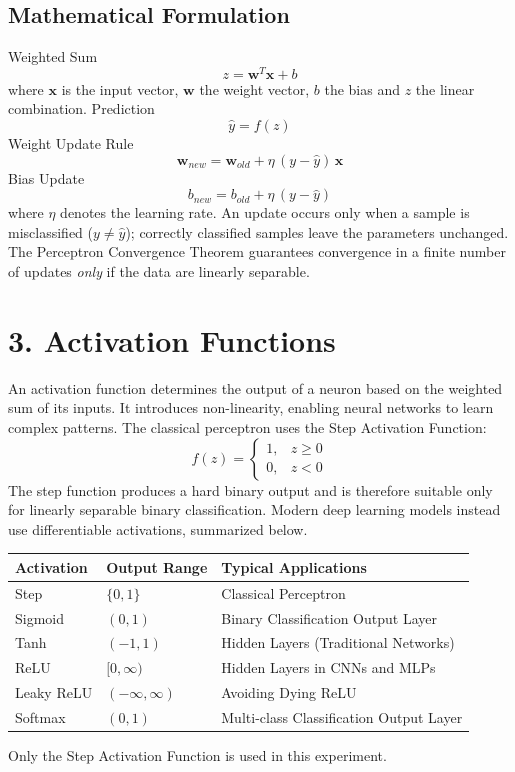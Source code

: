 \documentclass[11pt]{article}
\begin{document}
\subsection*{Mathematical Formulation}
Weighted Sum
\[
z=\mathbf{w}^{T}\mathbf{x}+b
\]
where $\mathbf{x}$ is the input vector, $\mathbf{w}$ the weight vector, $b$ the bias and $z$ the linear combination.
Prediction
\[
\hat y=f(z)
\]
Weight Update Rule
\[
\mathbf{w}_{new}=\mathbf{w}_{old}+\eta\,(y-\hat y)\,\mathbf{x}
\]
Bias Update
\[
b_{new}=b_{old}+\eta\,(y-\hat y)
\]
where $\eta$ denotes the learning rate. An update occurs only when a sample is misclassified ($y\neq\hat y$); correctly classified samples leave the parameters unchanged. The Perceptron Convergence Theorem guarantees convergence in a finite number of updates \emph{only} if the data are linearly separable.
\section*{3. Activation Functions}
An activation function determines the output of a neuron based on the weighted sum of its inputs. It introduces non-linearity, enabling neural networks to learn complex patterns. The classical perceptron uses the Step Activation Function:
\[
f(z)=
\begin{cases}
1,&z\ge0\\
0,&z<0
\end{cases}
\]
The step function produces a hard binary output and is therefore suitable only for linearly separable binary classification. Modern deep learning models instead use differentiable activations, summarized below.
\begin{center}
\begin{tabular}{|p{2.5cm}|p{3cm}|p{6cm}|}
\hline
\textbf{Activation} & \textbf{Output Range} & \textbf{Typical Applications}\\
\hline
Step & $\{0,1\}$ & Classical Perceptron\\
\hline
Sigmoid & $(0,1)$ & Binary Classification Output Layer\\
\hline
Tanh & $(-1,1)$ & Hidden Layers (Traditional Networks)\\
\hline
ReLU & $[0,\infty)$ & Hidden Layers in CNNs and MLPs\\
\hline
Leaky ReLU & $(-\infty,\infty)$ & Avoiding Dying ReLU\\
\hline
Softmax & $(0,1)$ & Multi-class Classification Output Layer\\
\hline
\end{tabular}
\end{center}
Only the Step Activation Function is used in this experiment.
\end{document}
